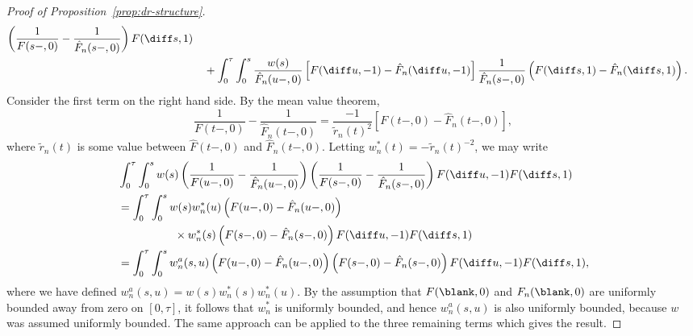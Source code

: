 \begin{proof}[Proof of Proposition~\ref{prop:dr-structure}]
\begin{align*}
        \left(
        \frac{1}{F(s-, 0)} -
        \frac{1}{\hat{F}_n(s-, 0)}
        \right)F(\diff s, 1)
      \\
      & \quad +
        \int_0^{\tau} 
        \int_0^s      
        \frac{w(s) }{\hat{F}_n(u-, 0)} 
        \left[
        F(\diff u, -1) - \hat{F}_n(\diff u, -1)
        \right]
        \frac{1}{\hat{F}_n(s-, 0)}
        \left(
        F(\diff s, 1) -
        \hat{F}_n(\diff s, 1)
        \right).
    \end{align*}
    \endgroup %
    Consider the first term on the right hand side. By the mean value theorem,
    \begin{equation*}
      \frac{1}{F(t-, 0)}
      - \frac{1}{\hat{F}_n(t-, 0)}
      = \frac{-1}{\tilde{r}_n(t)^2}
      \left[
        F(t-, 0)
        - \hat{F}_n(t-, 0)
      \right],
    \end{equation*}
    where \( \tilde{r}_n(t) \) is some value between \( \hat{F}(t-, 0) \) and
    \( \hat{F}_n(t-, 0) \). Letting \( w_n^*(t) = -\tilde{r}_n(t)^{-2} \), we
    may write
  \begin{align*}
    & \int_0^{\tau} 
      \int_0^s
      w(s) 
      \left(
      \frac{1}{F(u-, 0)} -  \frac{1}{\hat{F}_n(u-, 0)}
      \right)      
      \left(
      \frac{1}{F(s-, 0)} -
      \frac{1}{\hat{F}_n(s-, 0)}
      \right)F(\diff u, -1)F(\diff s, 1)
    \\
    & =
      \int_0^{\tau} 
      \int_0^s
      w(s)
      w_n^*(u) 
      \left(
      F(u-, 0) - \hat{F}_n(u-, 0)
      \right)
    \\
    & \qquad \qquad \quad
      \times
      w_n^*(s) 
      \left(
      F(s-, 0) - \hat{F}_n(s-, 0)
      \right)       
      F(\diff u, -1)F(\diff s, 1)
    \\
    & =
      \int_0^{\tau} 
      \int_0^s
      w_n^a(s,u)
      \left(
      F(u-, 0) - \hat{F}_n(u-, 0)
      \right)
      \left(
      F(s-, 0) - \hat{F}_n(s-, 0)
      \right)       
      F(\diff u, -1)F(\diff s, 1),
  \end{align*}
  where we have defined \( w_n^a(s,u) = w(s)w^*_n(s)w^*_n(u) \). By the
  assumption that \( F(\blank,0) \) and \( F_n(\blank,0) \) are uniformly
  bounded away from zero on \( [0,\tau] \), it follows that \( w_n^* \) is
  uniformly bounded, and hence \( w_n^a(s,u) \) is also uniformly bounded,
  because \( w \) was assumed uniformly bounded. The same approach can be
  applied to the three remaining terms which gives the result.
\end{proof}
